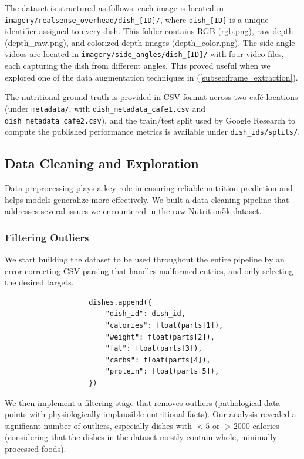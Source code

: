 \documentclass[a4paper]{article}
\begin{document}
            The dataset is structured as follows: each image is located in \texttt{imagery/realsense\_overhead/dish\_[ID]/}, where \texttt{dish\_[ID]} is a unique identifier assigned to every dish. This folder contains RGB (rgb.png), raw depth (depth\_raw.png), and colorized depth images (depth\_color.png). The side-angle videos are located in \texttt{imagery/side\_angles/dish\_[ID]/} with four video files, each capturing the dish from different angles. This proved useful when we explored one of the data augmentation techniques in (\autoref{subsec:frame_extraction}).
            
            The nutritional ground truth is provided in CSV format across two café locations (under \texttt{metadata/}, with \texttt{dish\_metadata\_cafe1.csv} and \texttt{dish\_metadata\_cafe2.csv}), and the train/test split used by Google Research to compute the published performance metrics is available under \texttt{dish\_ids/splits/}.
       
        \subsection{Data Cleaning and Exploration}
                    
            Data preprocessing plays a key role in ensuring reliable nutrition prediction and helps models generalize more effectively. We built a data cleaning pipeline that addresses several issues we encountered in the raw Nutrition5k dataset.
            
        \subsubsection{Filtering Outliers}
            We start building the dataset to be used throughout the entire pipeline by an error-correcting CSV parsing that handles malformed entries, and only selecting the desired targets.
                        
            \begin{verbatim}
                    dishes.append({
                        "dish_id": dish_id,
                        "calories": float(parts[1]),
                        "weight": float(parts[2]),
                        "fat": float(parts[3]),
                        "carbs": float(parts[4]),
                        "protein": float(parts[5]),
                    })
            \end{verbatim}


            We then implement a filtering stage that removes outliers (pathological data points with physiologically implausible nutritional facts).
            Our analysis revealed a significant number of outliers, especially dishes with $<5$ or $>2000$ calories (considering that the dishes in the dataset mostly contain whole, minimally processed foods).
\end{document}
